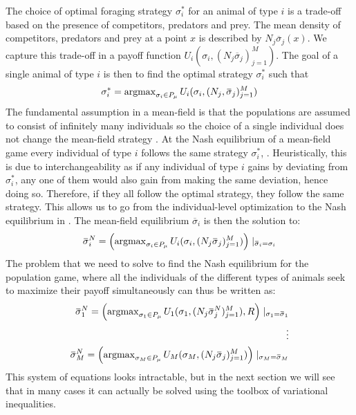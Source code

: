 The choice of optimal foraging strategy $\sigma_i^*$ for an animal of type $i$ is a trade-off based on the presence of competitors, predators and prey. The mean density of competitors, predators and prey at a point $x$ is described by $N_j \overbar{\sigma}_j(x)$. We capture this trade-off in a payoff function $U_i(\sigma_i, (N_j \overbar{\sigma}_j)_{j=1}^M)$. The goal of a single animal of type $i$ is then to find the optimal strategy $\sigma_i^*$ such that
\begin{equation}
  \label{eq:ind_opt}
  \sigma^*_i = \argmax_{\sigma_i \in P_{\mu}} U_i(\sigma_i, (N_j, \overbar{\sigma}_j)_{j=1}^M)
\end{equation}
The fundamental assumption in a mean-field is that the populations are assumed to consist of infinitely many individuals so the choice of a single individual does not change the mean-field strategy \citep{aumann1964markets}. At the Nash equilibrium of a mean-field game every individual of type $i$ follows the same strategy $\sigma_i^*$, \citep{lasry2007mean}. Heuristically, this is due to interchangeability as if any individual of type $i$ gains by deviating from $\sigma_i^*$, any one of them would also gain from making the same deviation, hence doing so. Therefore, if they all follow the optimal strategy, they follow the same strategy. This allows us to go from the individual-level optimization to the Nash equilibrium in . %
The mean-field equilibrium $\overbar{\sigma}_i$ is then the solution to:
\begin{equation}
  \label{eq:mfg_ne}
  \overbar{\sigma}_i^N = \pa{\argmax_{\sigma_i \in P_{\mu}} U_i(\sigma_i, (N_j \overbar{\sigma}_j)_{j=1}^M) } \mid_{\overbar{\sigma}_i = \sigma_i}
\end{equation}
The problem that we need to solve to find the Nash equilibrium for the population game, where all the individuals of the different types of animals seek to maximize their payoff simultaneously can thus be written as:
\begin{equation}
  \label{eq:tot_nash_eq}
  \begin{split}
    \overbar{\sigma}_1^N = \pa{\argmax_{\sigma_1 \in P_{\mu}} U_1(\sigma_1, (N_j \overbar{\sigma}^N_j)_{j=1}^M), R } \mid_{\sigma_1 = \overbar{\sigma}_1} \\
    \vdots \\
    \overbar{\sigma}_M^N = \pa{\argmax_{\sigma_M \in P_{\mu}} U_M(\sigma_M, (N_j \overbar{\sigma}_j)_{j=1}^M) } \mid_{\sigma_M = \overbar{\sigma}_M}
    \end{split}
\end{equation}
This system of equations looks intractable, but in the next section we will see that in many cases it can actually be solved using the toolbox of variational inequalities.



